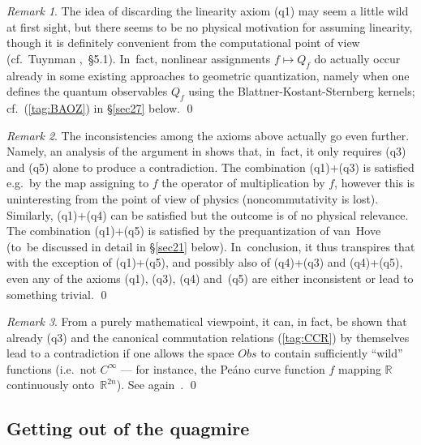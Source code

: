 \documentclass[11pt]{amsart}
\numberwithin{equation}{section}
\theoremstyle{remark}
\newtheorem{remark*}{Remark}
\newcommand\Obs{Obs}
\newcommand\RR{\mathbb R}
\begin{document}
\begin{remark*} The idea of discarding the linearity axiom (q1) may seem a
little wild at first sight, but there seems to be no physical motivation for
assuming linearity, though it is definitely convenient from the computational
point of view (cf.~Tuynman \cite{bib:TuyWis},~\S5.1). In~fact, nonlinear
assignments $f\mapsto Q_f$ do actually occur already in some existing
approaches to geometric quantization, namely when one defines the quantum
observables $Q_f$ using the Blattner-Kostant-Sternberg kernels;
cf.~(\ref{tag:BAOZ}) in \S\ref{sec27} below.   \qed  \end{remark*}

\begin{remark*} The inconsistencies among the axioms above actually go even
further. Namely, an analysis of the argument in \cite{bib:ETuy} shows that,
in~fact, it only requires (q3) and (q5) alone to produce a contradiction. The
combination (q1)+(q3) is satisfied e.g.~by the map assigning to $f$ the
operator of multiplication by $f$, however this is uninteresting from the point
of view of physics (noncommutativity is lost). Similarly, (q1)+(q4) can be
satisfied but the outcome is of no physical relevance. The combination
(q1)+(q5) is satisfied by the prequantization of van~Hove (to~be discussed in
detail in \S\ref{sec21} below). In~conclusion, it thus transpires that with the
exception of (q1)+(q5), and possibly also of (q4)+(q3) and (q4)+(q5), even
any  of the axioms (q1), (q3), (q4) and~(q5) are either
inconsistent or lead to something trivial.   \qed  \end{remark*}

\begin{remark*} From a purely mathematical viewpoint, it can, in fact, be shown
that already (q3) and the canonical commutation relations (\ref{tag:CCR}) by
themselves lead to a contradiction if one allows the space $\Obs$ to contain
sufficiently ``wild'' functions (i.e.~not $C^\infty$ --- for instance, the
Pe\'ano curve function $f$ mapping $\RR$ continuously onto~$\RR^{2n}$).
See again~\cite{bib:ETuy}.   \qed  \end{remark*}

\subsection{Getting out of the quagmire}
\end{document}

